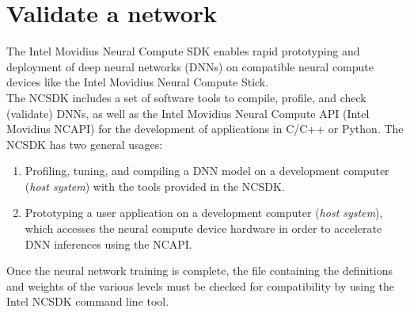 \section{Validate a network}
\label{sec:checknetwork}
The Intel Movidius Neural Compute SDK enables rapid prototyping and deployment 
of deep neural networks (DNNs) on compatible neural compute devices like the 
Intel Movidius Neural Compute Stick.\\ 
The NCSDK includes a set of software tools to compile, profile, and check 
(validate) DNNs, as well as the Intel Movidius Neural Compute API (Intel 
Movidius NCAPI) for the development of applications in C/C++ or Python.
The NCSDK has two general usages:
\begin{enumerate}
	\item Profiling, tuning, and compiling a DNN model on a development computer 
	(\emph{host system}) with the tools provided in the NCSDK.
	\item Prototyping a user application on a development computer (\emph{host system}), 
which accesses the neural compute device hardware in order to accelerate DNN 
inferences using the NCAPI. 
\end{enumerate}
Once the neural network training is complete, the file containing the 
definitions and weights of the various levels must be checked for compatibility 
by using the Intel NCSDK command line tool.
%

